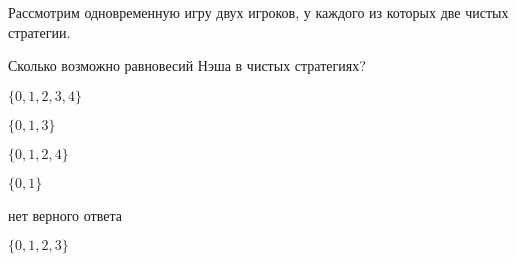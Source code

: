 
\begin{question}
Рассмотрим одновременную игру двух игроков, у каждого из которых две чистых стратегии.

Сколько возможно равновесий Нэша в чистых стратегиях?
\begin{answerlist}
  \item \(\{0, 1, 2, 3, 4\}\)
  \item \(\{0, 1, 3 \}\)
  \item \(\{0, 1, 2, 4\}\)
  \item \(\{0, 1\}\)
  \item нет верного ответа
  \item \(\{0, 1, 2, 3\}\)
\end{answerlist}
\end{question}


